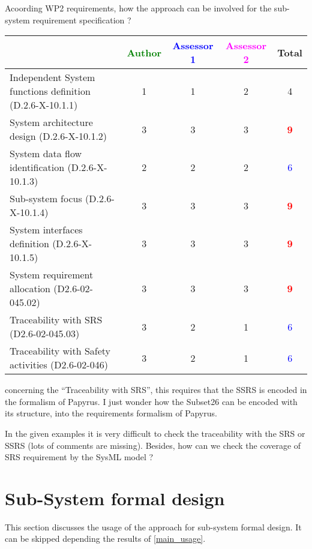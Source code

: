 Acoording WP2 requirements, how the approach can be involved for the sub-system requirement specification ?

\begin{tabular}{|l | c | c | c | c|}
\hline
& \textcolor{green}{Author} & \textcolor{blue}{Assessor 1} & \textcolor{magenta}{Assessor 2} & Total \\
\hline
Independent System functions definition (D.2.6-X-10.1.1) & 1     & 1     & 2     & 4     \\
\hline
System architecture design (D.2.6-X-10.1.2) & 3     & 3     & 3      & \textcolor{red}{\textbf{9}} \\
\hline
System data flow identification (D.2.6-X-10.1.3) & 2     & 2     & 2     & \textcolor{blue}{6} \\
\hline
Sub-system focus (D.2.6-X-10.1.4) & 3     & 3     & 3     & \textcolor{red}{\textbf{9}} \\
\hline
System interfaces definition (D.2.6-X-10.1.5) & 3     & 3     & 3     &  \textcolor{red}{\textbf{9}} \\
\hline
System requirement allocation (D2.6-02-045.02) & 3     & 3     & 3     & \textcolor{red}{\textbf{9}} \\
\hline
Traceability with SRS (D2.6-02-045.03) & 3     & 2     & 1     & \textcolor{blue}{6} \\
\hline
Traceability with Safety activities (D2.6-02-046) & 3     & 2     & 1     & \textcolor{blue}{6} \\
\hline
\end{tabular}

\begin{assessor1}
concerning the "`Traceability with SRS"', this requires that the SSRS is encoded in the formalism of Papyrus. I just wonder how the Subset26 can be encoded with its structure, into the requirements formalism of Papyrus. 
\end{assessor1}


\begin{assessor2}
In the given examples it is very difficult to check the traceability with the SRS or SSRS (lots of comments are missing). Besides, how can we check the coverage of SRS requirement by the SysML model ?
\end{assessor2}



\section{Sub-System formal design}
This section discusses the usage of the approach for sub-system formal design.
It can be skipped depending the results of \ref{main_usage}.


